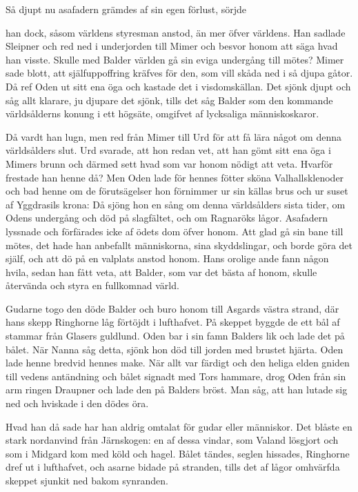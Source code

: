 Så djupt nu asafadern grämdes af sin egen förlust, sörjde

han dock, såsom världens styresman anstod, än mer öfver världens. Han
sadlade Sleipner och red ned i underjorden till Mimer och besvor honom
att säga hvad han visste. Skulle med Balder världen gå sin eviga
undergång till mötes? Mimer sade blott, att själfuppoffring kräfves för
den, som vill skåda ned i så djupa gåtor. Då ref Oden ut sitt ena öga
och kastade det i visdomskällan. Det sjönk djupt och såg allt klarare,
ju djupare det sjönk, tills det såg Balder som den kommande
världsålderns konung i ett högsäte, omgifvet af lycksaliga
människoskaror.

Då vardt han lugn, men red från Mimer till Urd för att få lära något om
denna världsålders slut. Urd svarade, att hon redan vet, att han gömt
sitt ena öga i Mimers brunn och därmed sett hvad som var honom nödigt
att veta. Hvarför frestade han henne då? Men Oden lade för hennes fötter
sköna Valhallsklenoder och bad henne om de förutsägelser hon förnimmer
ur sin källas brus och ur suset af Yggdrasils krona: Då sjöng hon en
sång om denna världsålders sista tider, om Odens undergång och död på
slagfältet, och om Ragnaröks lågor. Asafadern lyssnade och förfärades
icke af ödets dom öfver honom. Att glad gå sin bane till mötes, det hade
han anbefallt människorna, sina skyddslingar, och borde göra det själf,
och att dö på en valplats anstod honom. Hans orolige ande fann någon
hvila, sedan han fått veta, att Balder, som var det bästa af honom,
skulle återvända och styra en fullkomnad värld.

Gudarne togo den döde Balder och buro honom till Asgards västra strand,
där hans skepp Ringhorne låg förtöjdt i lufthafvet. På skeppet byggde de
ett bål af stammar från Glasers guldlund. Oden bar i sin famn Balders
lik och lade det på bålet. När Nanna såg detta, sjönk hon död till
jorden med brustet hjärta. Oden lade henne bredvid hennes make. När allt
var färdigt och den heliga elden gniden till vedens antändning och bålet
signadt med Tors hammare, drog Oden från sin arm ringen Draupner och
lade den på Balders bröst. Man såg, att han lutade sig ned och hviskade
i den dödes öra.

Hvad han då sade har han aldrig omtalat för gudar eller människor. Det
blåste en stark nordanvind från Järnskogen: en af dessa vindar, som
Valand lösgjort och som i Midgard kom med köld och hagel. Bålet tändes,
seglen hissades, Ringhorne dref ut i lufthafvet, och asarne bidade på
stranden, tills det af lågor omhvärfda skeppet sjunkit ned bakom
synranden.

